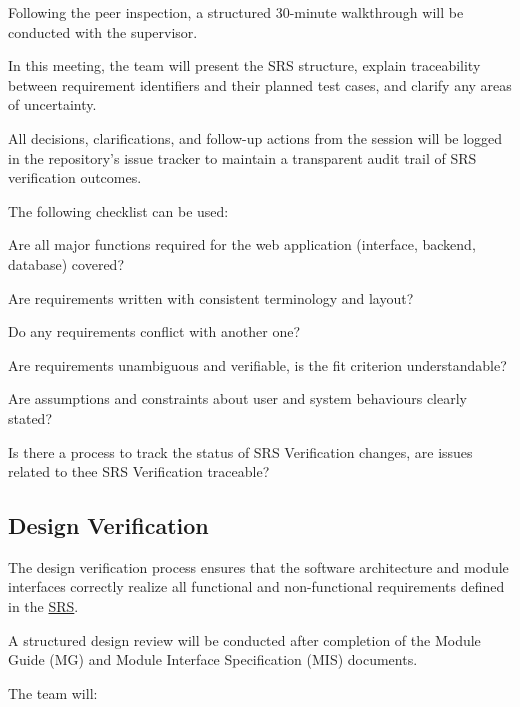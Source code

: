 \documentclass[12pt, titlepage]{article}
\begin{document}
Following the peer inspection, a structured 30-minute walkthrough will be
conducted with the supervisor.

In this meeting, the team will present the SRS structure, explain traceability
between requirement identifiers and their planned test cases, and clarify any
areas of uncertainty.

All decisions, clarifications, and follow-up actions from the session will be
logged in the repository’s issue tracker to maintain a transparent audit trail
of SRS verification outcomes.

The following checklist can be used:
\begin{todolist}
  \item Are all major functions required for the web application (interface, backend, database) covered?
  \item Are requirements written with consistent terminology and layout?
  \item Do any requirements conflict with another one?
  \item Are requirements unambiguous and verifiable, is the fit criterion understandable?
  \item Are assumptions and constraints about user and system behaviours clearly stated?
  \item Is there a process to track the status of SRS Verification changes, are issues related to thee SRS Verification traceable?
\end{todolist}

\subsection{Design Verification}
\label{subsec:design-verification}
The design verification process ensures that the software architecture and
module interfaces correctly realize all functional and non-functional
requirements defined in the \href{https://github.com/thaafei/DomainX/blob/main/docs/SRS/SRS.pdf}{SRS}.

A structured design review will be conducted after completion of the Module
Guide (MG) and Module Interface Specification (MIS) documents.

The team will:
\end{document}
